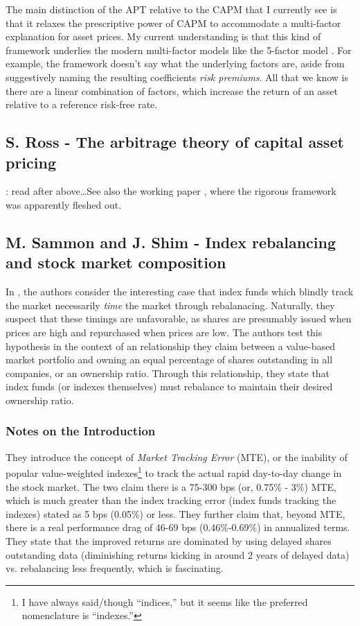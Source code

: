 The main distinction of the APT relative to the CAPM that I currently see is that it relaxes the prescriptive power of CAPM to accommodate a multi-factor explanation for asset prices.  My current understanding is that this kind of framework underlies the modern multi-factor models like the 5-factor model \cite{Fama2015}.  For example, the framework doesn't say what the underlying factors are, aside from suggestively naming the resulting coefficients {\it risk premiums}.  All that we know is there are a linear combination of factors, which increase the return of an asset relative to a reference risk-free rate.  


\subsection{S. Ross - The arbitrage theory of capital asset pricing}

\note{[Todo]}: read \cite{Ross1976} after above\ldots  See also the working paper \cite{Ross1971}, where the rigorous framework was apparently fleshed out.


\subsection{M. Sammon and J. Shim - Index rebalancing and stock market composition}

In \cite{Sammon2026}, the authors consider the interesting case that index funds which blindly track the market necessarily {\it time} the market through rebalanacing.  Naturally, they suspect that these timings are unfavorable, as shares are presumably issued when prices are high and repurchased when prices are low.  The authors test this hypothesis in the context of an relationship they claim between a value-based market portfolio and owning an equal percentage of shares outstanding in all companies, or an ownership ratio.  Through this relationship, they state that index funds (or indexes themselves) must rebalance to maintain their desired ownership ratio.

\subsubsection{Notes on the Introduction}

They introduce the concept of {\it Market Tracking Error} (MTE), or the inability of popular value-weighted indexes\footnote{I have always said/though ``indices,'' but it seems like the preferred nomenclature is ``indexes.''} to track the actual rapid day-to-day change in the stock market.  The two claim there is a 75-300 bps (or, 0.75\% - 3\%) MTE, which is much greater than the index tracking error (index funds tracking the indexes) stated as 5 bps (0.05\%) or less.  They further claim that, beyond MTE, there is a real performance drag of 46-69 bps (0.46\%-0.69\%) in annualized terms.  They state that the improved returns are dominated by using delayed shares outstanding data (diminishing returns kicking in around 2 years of delayed data) vs. rebalancing less frequently, which is fascinating.

